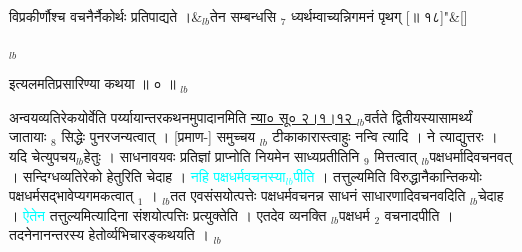 \documentclass[article,12pt,a4paper]{memoir}%
\newcommand{\quotelemma}[1]{\textcolor{cyan}{#1}}
\newcounter{parCount}
\begin{document}
	  
	  
	  \endgroup
	
	  \bigskip
	  \begingroup
	
	    
	    \stanza[\smallbreak]
	  विप्रकीर्णौश्च वचनैर्नैकोर्थः प्रतिपाद्यते ।&{\tiny $_{lb}$}तेन सम्बन्धसि {\tiny $_{7}$} ध्यर्थम्वाच्यन्निगमनं पृथग् [॥ १८]{\normalfontlatin\large\qquad{}"}\&[\smallbreak]
	  
	  
	  
	  \endgroup
	{\tiny $_{lb}$}

	  
	  \pstart \leavevmode%
	इत्यलमतिप्रसारिण्या कथया ॥ ० ॥
	{}
	\pend%
      {\tiny $_{lb}$}

	  
	  \pstart \leavevmode%
	अन्वयव्यतिरेकयोर्वेति पर्य्यायान्तरकथनमुपादानमिति \href{http://sarit.indology.info/?cref=ns\%C5\%AB.2.1.12}{न्या० सू० २।१।१२ } {\tiny $_{lb}$}वर्तते द्वितीयस्यासामर्थ्यं जातायाः {\tiny $_{8}$} सिद्धेः पुनरजन्यत्वात् । [प्रमाण-] समुच्चय {\tiny $_{lb}$} टीकाकारास्त्वाहुः नन्वि \cite[6b4]{vn-msN} त्यादि । ने \cite[6b4]{vn-msN} त्याद्युत्तरः । यदि चेत्युपचय{\tiny $_{lb}$}हेतुः । साधनावयवः प्रतिज्ञां प्राप्नोति नियमेन साध्यप्रतीतिनि {\tiny $_{9}$} \leavevmode{} मित्तत्वात् {\tiny $_{lb}$}पक्षधर्मादिवचनवत् । सन्दिग्धव्यतिरेको हेतुरिति चेदाह । \quotelemma{नहि पक्षधर्मवचनस्या{\tiny $_{lb}$}पीति} \cite[6b6]{vn-msN} । तत्तुल्यमिति विरुद्धानैकान्तिकयोः पक्षधर्मसद्भावेप्यगमकत्वात् {\tiny $_{1}$} । {\tiny $_{lb}$}तत एवसंसयोत्पत्तेः पक्षधर्मवचनन्न साधनं साधारणादिवचनवदिति {\tiny $_{lb}$}चेदाह । \quotelemma{ऐतेन} \cite[6b7]{vn-msN} तत्तुल्यमित्यादिना संशयोत्पत्तिः प्रत्युक्तेति । एतदेव व्यनक्ति {\tiny $_{lb}$}पक्षधर्म {\tiny $_{2}$} वचनादपीति । तदनेनानन्तरस्य हेतोर्व्यभिचारङ्कथयति ।
	{}
	\pend%
      {\tiny $_{lb}$}
\end{document}
